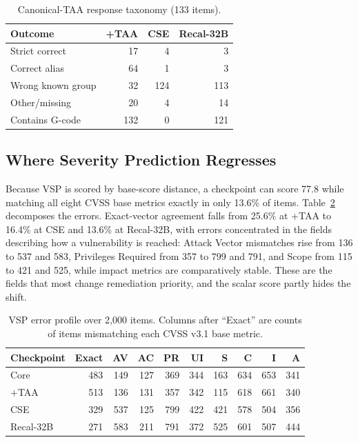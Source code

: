 \documentclass[conference]{IEEEtran}
\begin{document}
\begin{table}[t]
\caption{Canonical-TAA response taxonomy (133 items).}
\label{tab:taaerrors}
\centering
\scriptsize
\setlength{\tabcolsep}{2.7pt}
\begin{tabular}{@{}lrrr@{}}
\toprule
Outcome & +TAA & CSE & Recal-32B \\
\midrule
Strict correct & 17 & 4 & 3 \\
Correct alias & 64 & 1 & 3 \\
Wrong known group & 32 & 124 & 113 \\
Other/missing & 20 & 4 & 14 \\
Contains G-code & 132 & 0 & 121 \\
\bottomrule
\end{tabular}
\end{table}

\subsection{Where Severity Prediction Regresses}
Because VSP is scored by base-score distance, a checkpoint can score 77.8 while matching all eight CVSS base metrics exactly in only 13.6\% of items. Table~\ref{tab:vsp} decomposes the errors. Exact-vector agreement falls from 25.6\% at +TAA to 16.4\% at CSE and 13.6\% at Recal-32B, with errors concentrated in the fields describing how a vulnerability is reached: Attack Vector mismatches rise from 136 to 537 and 583, Privileges Required from 357 to 799 and 791, and Scope from 115 to 421 and 525, while impact metrics are comparatively stable. These are the fields that most change remediation priority, and the scalar score partly hides the shift.

\begin{table}[t]
\caption{VSP error profile over 2,000 items. Columns after ``Exact'' are counts of items mismatching each CVSS v3.1 base metric.}
\label{tab:vsp}
\centering
\scriptsize
\setlength{\tabcolsep}{2.2pt}
\begin{tabular}{@{}lrrrrrrrrr@{}}
\toprule
Checkpoint & Exact & AV & AC & PR & UI & S & C & I & A \\
\midrule
Core & 483 & 149 & 127 & 369 & 344 & 163 & 634 & 653 & 341 \\
+TAA & 513 & 136 & 131 & 357 & 342 & 115 & 618 & 661 & 340 \\
CSE & 329 & 537 & 125 & 799 & 422 & 421 & 578 & 504 & 356 \\
Recal-32B & 271 & 583 & 211 & 791 & 372 & 525 & 601 & 507 & 444 \\
\bottomrule
\end{tabular}
\end{table}
\end{document}
